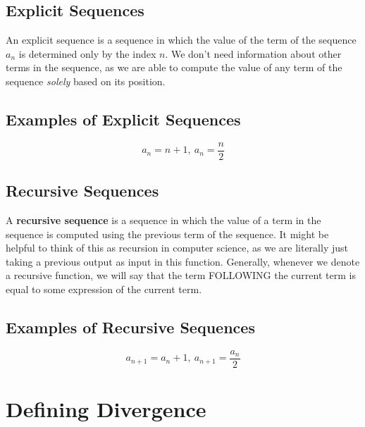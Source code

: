 \documentclass{report}
\newtheorem{definition}{Definition}
\begin{document}
\begin{sloppypar}
\subsection{Explicit Sequences}
An explicit sequence is a sequence in which the value of the term of the sequence $ a_{n}$ is determined only by the
index $ n $. We don't need information about other terms in the sequence, as we are able to compute the value of any
term of the sequence \textit{solely} based on its position.
\subsection{Examples of Explicit Sequences}
\[ a_{n} = n + 1, ~ a_{n} = \frac{n}{2} \]
\subsection{Recursive Sequences}
A \textbf{recursive sequence} is a sequence in which the value of a term in the sequence is computed using the previous
term of the sequence. It might be helpful to think of this as recursion in computer science, as we are literally just taking
a previous output as input in this function. Generally, whenever we denote a recursive function, we will say that the
term FOLLOWING the current term is equal to some expression of the current term.
\subsection{Examples of Recursive Sequences}
\[ a_{n+1} = a_{n} + 1, ~ a_{n+1} = \frac{a_{n}}{2}\]



\section{Defining Divergence}
\begin{center}
\end{center}
\begin{center}
\end{center}


\end{sloppypar}
\end{document}
